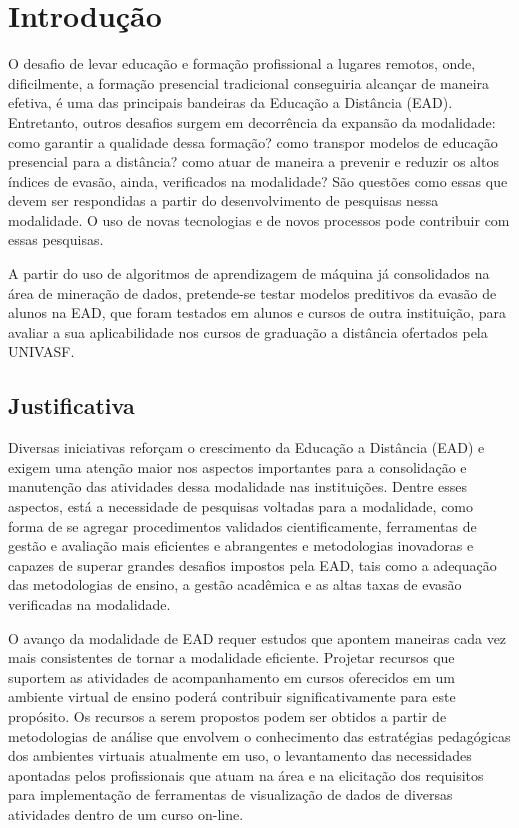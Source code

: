 \chapter{Introdução}

O desafio de levar educação e formação profissional a lugares remotos, onde,
dificilmente, a formação presencial tradicional conseguiria alcançar de maneira
efetiva, é uma das principais bandeiras da Educação a Distância (EAD).
Entretanto, outros desafios surgem em decorrência da expansão da modalidade:
como garantir a qualidade dessa formação? como transpor modelos de educação
presencial para a distância? como atuar de maneira a prevenir e reduzir os altos
índices de evasão, ainda, verificados na modalidade? São questões como essas que
devem ser respondidas a partir do desenvolvimento de pesquisas nessa modalidade.
O uso de novas tecnologias e de novos processos pode contribuir com essas
pesquisas.

A partir do uso de algoritmos de aprendizagem de máquina já consolidados na área
de mineração de dados, pretende-se testar modelos preditivos da evasão de alunos
na EAD, que foram testados em alunos e cursos de outra instituição, para
avaliar a sua aplicabilidade nos cursos de graduação a distância
ofertados pela UNIVASF.

\section{Justificativa}

Diversas iniciativas reforçam o crescimento da Educação a Distância (EAD) e
exigem uma atenção maior nos aspectos importantes para a consolidação e
manutenção das atividades dessa modalidade nas instituições. Dentre esses
aspectos, está a necessidade de pesquisas voltadas para a modalidade, como forma
de se agregar procedimentos validados cientificamente, ferramentas de gestão e
avaliação mais eficientes e abrangentes e metodologias inovadoras e capazes de
superar grandes desafios impostos pela EAD, tais como a adequação das
metodologias de ensino, a gestão acadêmica e as altas taxas de evasão
verificadas na modalidade.

O avanço da modalidade de EAD requer estudos que apontem maneiras cada vez mais
consistentes de tornar a modalidade eficiente. Projetar recursos que suportem as
atividades de acompanhamento em cursos oferecidos em um ambiente virtual de
ensino poderá contribuir significativamente para este propósito. Os recursos a
serem propostos podem ser obtidos a partir de metodologias de análise que
envolvem o conhecimento das estratégias pedagógicas dos ambientes virtuais
atualmente em uso, o levantamento das necessidades apontadas pelos profissionais
que atuam na área e na elicitação dos requisitos para implementação de
ferramentas de visualização de dados de diversas atividades dentro de um curso
on-line. \cite{ramos2016abordagem}

